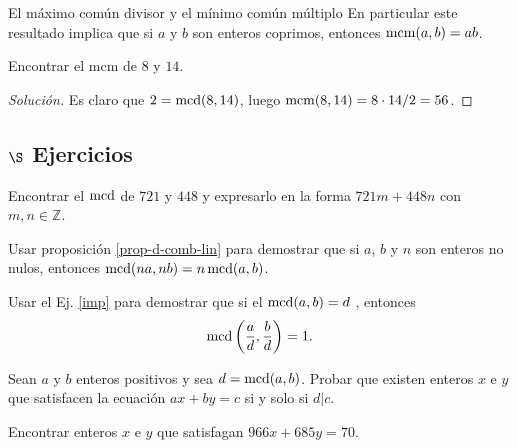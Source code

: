 \begin{section}{El máximo común divisor y el mínimo común múltiplo}
En particular este resultado implica que si $a$ y $b$ son enteros
coprimos, entonces $\operatorname{mcm}(a,b)=ab$.


\begin{ejemplo*} Encontrar el  mcm de $8$ y $14$.
    \begin{proof}[Solución] 
        Es claro que $2 = \operatorname{mcd}(8,14)$, luego $\operatorname{mcm}(8,14) = 8 \cdot 14 / 2 = 56$. 
    \end{proof}
\end{ejemplo*}


\subsection*{$\S$ Ejercicios}

\begin{enumex}
\item Encontrar el $\operatorname{mcd}$ de $721$ y $448$ y expresarlo en la forma
$721m+448n$ con $m,n \in \mathbb Z$.
\item\label{imp} Usar  proposición \ref{prop-d-comb-lin} para demostrar que si $a$, $b$ y $n$ son enteros no nulos, entonces
$\operatorname{mcd}(na,nb)=n\operatorname{mcd}(a,b)$.
\item Usar el  Ej. \ref{imp} para demostrar que si el
$\operatorname{mcd}(a,b)=d$ , entonces
$$
\operatorname{mcd}\left(\frac{a}{d},\frac{b}{d}\right) =1.
$$
\item  Sean $a$ y $b$ enteros positivos y sea $d=\operatorname{mcd}(a,b)$. Probar que existen
enteros $ x$ e $y$ que satisfacen la ecuación $ax+by=c$ si y solo
si $d|c$.
\item  Encontrar enteros $x$ e $y$ que satisfagan $966x+685y=70.$
\end{enumex}

\end{section}


